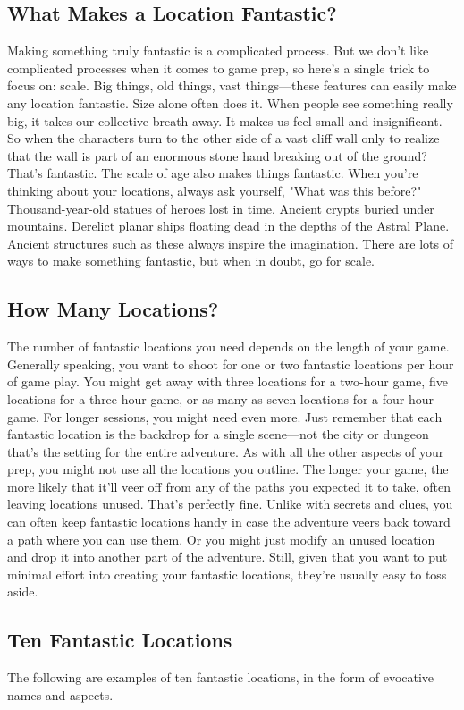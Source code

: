 \documentclass[10pt,a4paper,twoside,bg=print,twocolumn,openany,nodeprecatedcode]{dndbook}
\begin{document}
\subsection{What Makes a Location Fantastic?}
Making something truly fantastic is a complicated process. But we don't like complicated processes when it comes to game prep, so here's a single trick to focus on: scale. Big things, old things, vast things—these features can easily make any location fantastic. Size alone often does it. When people see something really big, it takes our collective breath away. It makes us feel small and insignificant. So when the characters turn to the other side of a vast cliff wall only to realize that the wall is part of an enormous stone hand breaking out of the ground? That's fantastic.
The scale of age also makes things fantastic. When you're thinking about your locations, always ask yourself, "What was this before?" Thousand-year-old statues of heroes lost in time. Ancient crypts buried under mountains. Derelict planar ships floating dead in the depths of the Astral Plane. Ancient structures such as these always inspire the imagination.
There are lots of ways to make something fantastic, but when in doubt, go for scale.
\subsection{How Many Locations?}
The number of fantastic locations you need depends on the length of your game. Generally speaking, you want to shoot for one or two fantastic locations per hour of game play. You might get away with three locations for a two-hour game, five locations for a three-hour game, or as many as seven locations for a four-hour game. For longer sessions, you might need even more. Just remember that each fantastic location is the backdrop for a single scene—not the city or dungeon that's the setting for the entire adventure.
As with all the other aspects of your prep, you might not use all the locations you outline. The longer your game, the more likely that it'll veer off from any of the paths you expected it to take, often leaving locations unused. That's perfectly fine. Unlike with secrets and clues, you can often keep fantastic locations handy in case the adventure veers back toward a path where you can use them. Or you might just modify an unused location and drop it into another part of the adventure. Still, given that you want to put minimal effort into creating your fantastic locations, they're usually easy to toss aside.
\subsection{Ten Fantastic Locations}
The following are examples of ten fantastic locations, in the form of evocative names and aspects.
\end{document}
